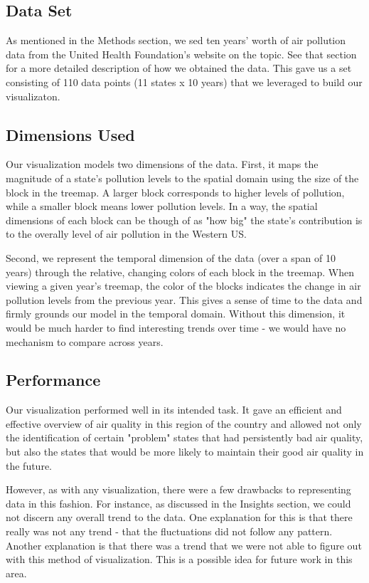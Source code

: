 \documentclass[journal]{vgtc}                %
\begin{document}
\subsection{Data Set}

As mentioned in the Methods section, we sed ten years' worth of air pollution data from the United Health Foundation's
website on the topic. See that section for a more detailed description of how we obtained the data. 
This gave us a set consisting of 110 data points (11 states x 10 years) that we leveraged to build our visualizaton. 

\subsection{Dimensions Used}

Our visualization models two dimensions of the data. First, it maps the magnitude of a state's pollution levels to 
the spatial domain using the size of the block in the treemap. A larger block corresponds to higher levels of pollution, 
while a smaller block means lower pollution levels. In a way, the spatial dimensions of each block can be though of as 
"how big" the state's contribution is to the overally level of air pollution in the Western US.

Second, we represent the temporal dimension of the data (over a span of 10 years) through the relative, changing colors of each block
in the treemap. When viewing a given year's treemap, the color of the blocks indicates the change in air pollution levels 
from the previous year. This gives a sense of time to the data and firmly grounds our model in the temporal domain. Without
this dimension, it would be much harder to find interesting trends over time - we would have no mechanism to compare 
across years.

\subsection{Performance}

Our visualization performed well in its intended task. It gave an efficient and effective overview of air quality in this 
region of the country and allowed not only the identification of certain "problem" states that had persistently bad
air quality, but also the states that would be more likely to maintain their good air quality in the future.

However, as with any visualization, there were a few drawbacks to representing data in this fashion. For instance, as discussed
in the Insights section, we could not discern any overall trend to the data. One explanation for this is that there really was
not any trend - that the fluctuations did not follow any pattern. Another explanation is that there was a trend that we were not
able to figure out with this method of visualization. This is a possible idea for future work in this area. 
\end{document}
